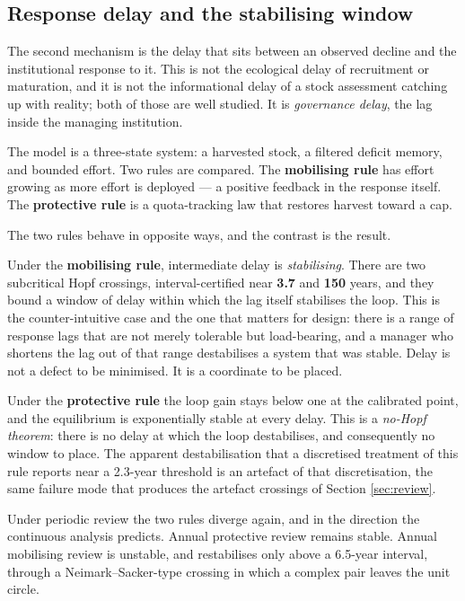 \subsection{Response delay and the stabilising window}
\label{sec:delay}

The second mechanism is the delay that sits between an observed decline and the
institutional response to it. This is not the ecological delay of recruitment or
maturation, and it is not the informational delay of a stock assessment catching up with
reality; both of those are well studied. It is \emph{governance delay}, the lag inside the
managing institution.

The model is a three-state system: a harvested stock, a filtered deficit memory, and
bounded effort. Two rules are compared. The \textbf{mobilising rule} has effort growing as
more effort is deployed --- a positive feedback in the response itself. The
\textbf{protective rule} is a quota-tracking law that restores harvest toward a cap.

The two rules behave in opposite ways, and the contrast is the result.

Under the \textbf{mobilising rule}, intermediate delay is \emph{stabilising}. There are
two subcritical Hopf crossings, interval-certified near \textbf{3.7} and \textbf{150}
years, and they bound a window of delay within which the lag itself stabilises the loop.
This is the counter-intuitive case and the one that matters for design: there is a range
of response lags that are not merely tolerable but load-bearing, and a manager who
shortens the lag out of that range destabilises a system that was stable. Delay is not a
defect to be minimised. It is a coordinate to be placed.

Under the \textbf{protective rule} the loop gain stays below one at the calibrated point,
and the equilibrium is exponentially stable at every delay. This is a \emph{no-Hopf
theorem}: there is no delay at which the loop destabilises, and consequently no window to
place. The apparent destabilisation that a discretised treatment of this rule reports near
a 2.3-year threshold is an artefact of that discretisation, the same failure mode that
produces the artefact crossings of Section \ref{sec:review}.

Under periodic review the two rules diverge again, and in the direction the continuous
analysis predicts. Annual protective review remains stable. Annual mobilising review is
unstable, and restabilises only above a 6.5-year interval, through a
Neimark--Sacker-type crossing in which a complex pair leaves the unit circle.

